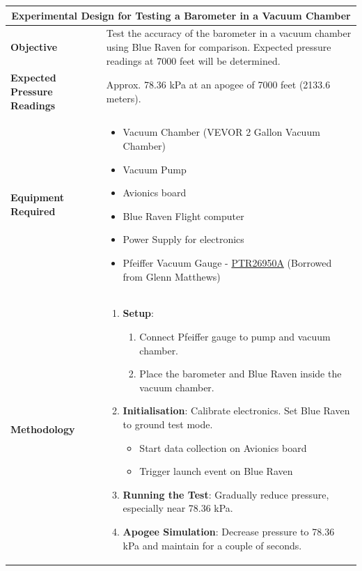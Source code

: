\begin{longtable}{|p{4cm}|p{10cm}|}
\hline
\multicolumn{2}{|c|}{\textbf{Experimental Design for Testing a Barometer in a Vacuum Chamber}} \\
\hline
\textbf{Objective} & Test the accuracy of the barometer in a vacuum chamber using Blue Raven for comparison. Expected pressure readings at 7000 feet will be determined. \\
\hline
\textbf{Expected Pressure Readings} & Approx. 78.36 kPa at an apogee of 7000 feet (2133.6 meters). \\
\hline
\textbf{Equipment Required} & 
\begin{itemize}
    \item Vacuum Chamber (VEVOR 2 Gallon Vacuum Chamber)
    \item Vacuum Pump
    \item Avionics board
    \item Blue Raven Flight computer
    \item Power Supply for electronics
    \item Pfeiffer Vacuum Gauge - \href{https://www.pfeiffer-vacuum.com/en/products/measurement-analysis-and-control/pressure-sensors/ptr-2695-0/ptr26950a/}{PTR26950A} (Borrowed from Glenn Matthews)
\end{itemize} \\
\hline
\textbf{Methodology} & 
\begin{enumerate}
    \item \textbf{Setup}:
    \begin{enumerate}
        \item Connect Pfeiffer gauge to pump and vacuum chamber.
        \item Place the barometer and Blue Raven inside the vacuum chamber.
    \end{enumerate}
    \item \textbf{Initialisation}: Calibrate electronics. Set Blue Raven to ground test mode.
    \begin{itemize}
        \item Start data collection on Avionics board
        \item Trigger launch event on Blue Raven
    \end{itemize}
    \item \textbf{Running the Test}: Gradually reduce pressure, especially near 78.36 kPa.
    \item \textbf{Apogee Simulation}: Decrease pressure to 78.36 kPa and maintain for a couple of seconds.

\end{enumerate}
\end{longtable}
